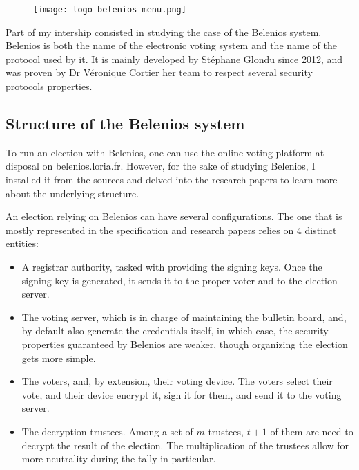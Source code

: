 \documentclass[12pt, a4paper]{report}
\begin{document}
\begin{figure}[H]
\centering
\texttt{[image: logo-belenios-menu.png]}
\end{figure}


Part of my intership consisted in studying the case of the Belenios system.
Belenios is both the name of the electronic voting system and the name of the protocol used by it.
It is mainly developed by Stéphane Glondu since 2012, and was proven by Dr Véronique Cortier her team to respect several security protocols properties.


\subsection{Structure of the Belenios system}

To run an election with Belenios, one can use the online voting platform at disposal on belenios.loria.fr. However, for the sake of studying Belenios, I installed it from the sources and delved into the research papers to learn more about the underlying structure.

An election relying on Belenios can have several configurations. The one that is mostly represented in the specification and research papers relies on 4 distinct entities:

\begin{itemize}
\item A registrar authority, tasked with providing the signing keys. Once the signing key is generated, it sends it to the proper voter and to the election server.

\item The voting server, which is in charge of maintaining the bulletin board, and, by default also generate the credentials itself, in which case, the security properties guaranteed by Belenios are weaker, though organizing the election gets more simple.

\item The voters, and, by extension, their voting device. The voters select their vote, and their device encrypt it, sign it for them, and send it to the voting server.

\item The decryption trustees. Among a set of $m$ trustees, $t + 1$ of them are need to decrypt the result of the election. The multiplication of the trustees allow for more neutrality during the tally in particular.
 \end{itemize}
\end{document}

